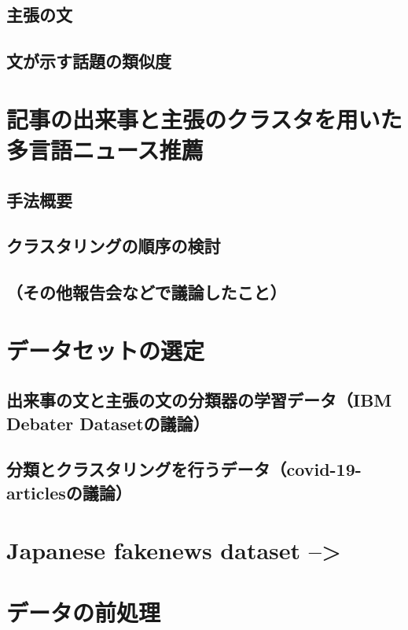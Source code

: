 \documentclass[12pt,a4j]{jreport}
\begin{document}
\subsection{主張の文}


\subsection{文が示す話題の類似度}


\section{記事の出来事と主張のクラスタを用いた多言語ニュース推薦}


\subsection{手法概要}


\subsection{クラスタリングの順序の検討}


\subsection{（その他報告会などで議論したこと）}


\section{データセットの選定}


\subsection{出来事の文と主張の文の分類器の学習データ（IBM Debater Datasetの議論）}


\subsection{分類とクラスタリングを行うデータ（covid-19-articlesの議論）}


\section{Japanese fakenews dataset -->}


\section{データの前処理}
\end{document}
